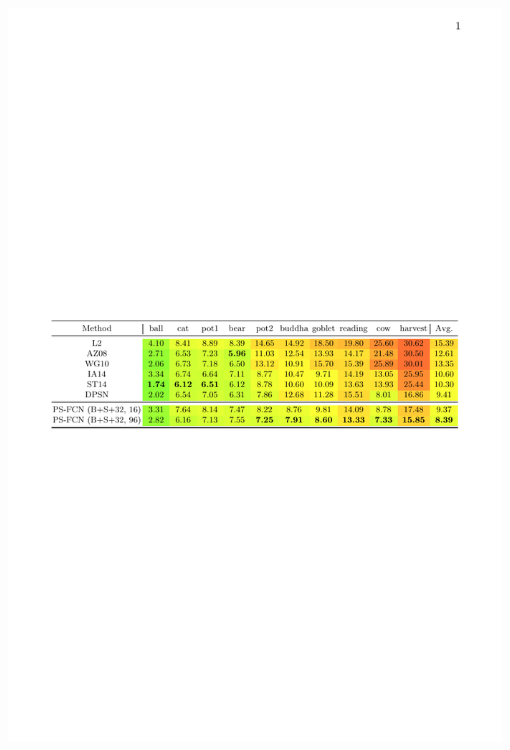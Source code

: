 {\begin{minipage}[t]{0.5\textwidth}
\begin{center}
            \includegraphics[width=0.98\textwidth]{images/res_quant_diligent_main}
        \end{center}
    \end{minipage}

    \vspace{0.5em}

}
